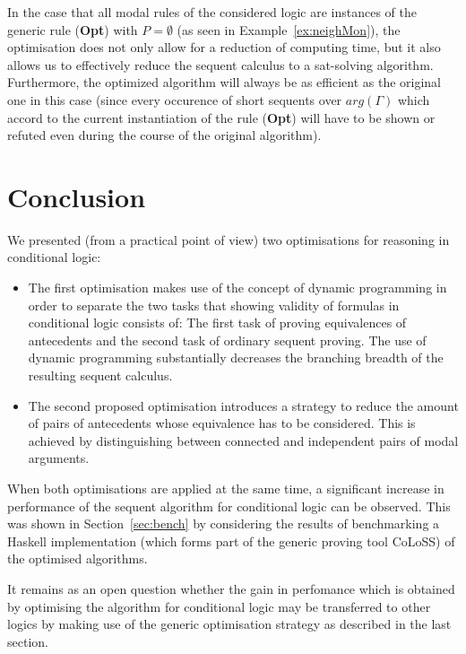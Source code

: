 \documentclass{entcs} \usepackage{entcsmacro}
\newcommand{\COLOSS}{{\textrm CoLoSS}}
\begin{document}
\begin{remark}
In the case that all modal rules of the considered logic are instances of
the generic rule (\textbf{Opt}) with $P=\emptyset$ (as seen in Example~\ref{ex:neighMon}),
the optimisation does not only allow for a reduction of computing time, but
it also allows us to effectively reduce the sequent calculus to a sat-solving
algorithm.
Furthermore, the optimized algorithm will always be as efficient as the
original one in this case (since every occurence of short sequents over $arg(\Gamma)$ 
which accord to the current instantiation of the rule (\textbf{Opt}) will
have to be shown or refuted even during the course of the original algorithm).
\end{remark}

\section{Conclusion}  

We presented (from a practical point of view) two optimisations for reasoning
in conditional logic:
\begin{itemize}
\item The first optimisation makes use of the concept of dynamic programming
in order to separate the two tasks that showing validity of formulas in conditional
logic consists of: The first task of proving equivalences of antecedents and the second task
of ordinary sequent proving. The use of dynamic programming substantially decreases the
branching breadth of the resulting sequent calculus.
\item The second proposed optimisation introduces a strategy to reduce the amount
of pairs of antecedents whose equivalence has to be considered. This is achieved
by distinguishing between connected and independent pairs of modal arguments.
\end{itemize}
When both optimisations are applied at the same time, a significant increase in
performance of the sequent algorithm for conditional logic can be observed.
This was shown in 
Section~\ref{sec:bench} by considering the results of benchmarking a Haskell
implementation (which forms part of the generic proving tool \COLOSS) of the
optimised algorithms.

It remains as an open question whether the gain in perfomance which is obtained
by optimising the algorithm for conditional logic may be transferred to other
logics by making use of the generic optimisation strategy as described in the
last section.



\end{document}
